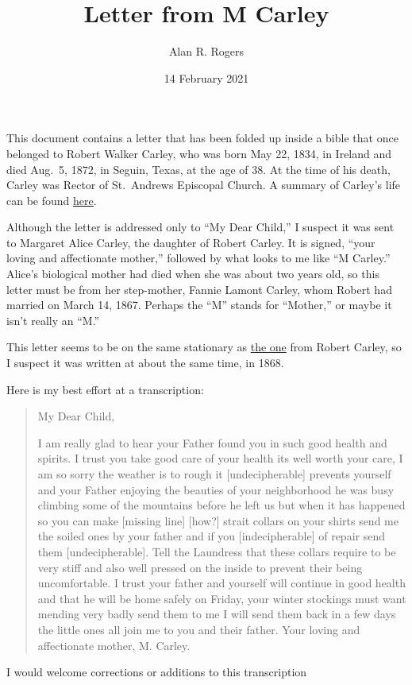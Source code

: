 \documentclass[12pt]{article}
\begin{document}
\title{Letter from M Carley}
\author{Alan R. Rogers}
\date{14 February 2021}
\maketitle

This document contains a letter that has been folded up inside a bible
that once belonged to Robert Walker Carley, who was born May 22, 1834,
in Ireland and died Aug.\ 5, 1872, in Seguin, Texas, at the age of
38. At the time of his death, Carley was Rector of St.\ Andrews
Episcopal Church. A summary of Carley's life can be found
\href{https://www.newspapers.com/clip/21483199/robert-walker-carley-bio-from-seguin}{here}.

Although the letter is addressed only to ``My Dear Child,'' I suspect
it was sent to Margaret Alice Carley, the daughter of Robert
Carley. It is signed, ``your loving and affectionate mother,''
followed by what looks to me like ``M Carley.'' Alice's biological
mother had died when she was about two years old, so this letter must
be from her step-mother, Fannie Lamont Carley, whom Robert had married
on March 14, 1867. Perhaps the ``M'' stands for ``Mother,'' or maybe
it isn't really an ``M.''

This letter seems to be on the same stationary as
\href{./RobtCarley.pdf}{the one} from Robert Carley, so I suspect it
was written at about the same time, in 1868.

Here is my best effort at a transcription:
\begin{quotation}
  \noindent My Dear Child,

  I am really glad to hear your Father found you in such good health
  and spirits. I trust you take good care of your health its well
  worth your care, I am so sorry the weather is to rough it
  [undecipherable] prevents yourself and your Father enjoying the
  beauties of your neighborhood he was busy climbing some of the
  mountains before he left us but when it has happened so you can make
  [missing line] [how?] strait collars on your shirts send me the
  soiled ones by your father and if you [indecipherable] of repair
  send them [undecipherable]. Tell the Laundress that these collars
  require to be very stiff and also well pressed on the inside to
  prevent their being uncomfortable. I trust your father and yourself
  will continue in good health and that he will be home safely on
  Friday, your winter stockings must want mending very badly send them
  to me I will send them back in a few days the little ones all join
  me to you and their father. Your loving and affectionate mother,
  M. Carley. 
\end{quotation}
I would welcome corrections or additions to this transcription
\end{document}
